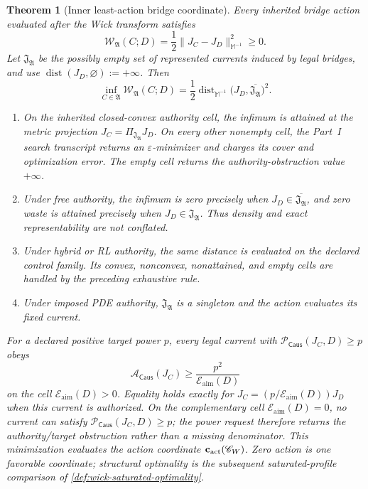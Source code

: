 \documentclass[11pt]{article}
\numberwithin{section}{part}
\theoremstyle{plain}
\newtheorem{theorem}{Theorem}[section]
\theoremstyle{definition}
\theoremstyle{remark}
\newcommand{\Caus}{\mathsf{Caus}}
\begin{document}
\begin{theorem}[Inner least-action bridge coordinate]
\label{thm:wick-least-action-law}
Every inherited bridge action evaluated after the Wick transform satisfies
\begin{equation}
 \label{eq:wick-completed-action-square}
 \mathscr W_{\mathfrak A}(C;D)
 =\frac12\|J_C-J_D\|_{\mathbb M^{-1}}^2\ge0.
\end{equation}
Let \(\mathfrak J_{\mathfrak A}\) be the possibly empty set of represented
currents induced by legal bridges, and use
\(\operatorname{dist}(J_D,\varnothing):=+\infty\).  Then
\begin{equation}
 \label{eq:wick-action-distance}
 \inf_{C\in\mathfrak A}\mathscr W_{\mathfrak A}(C;D)
 =\frac12\operatorname{dist}_{\mathbb M^{-1}}
   \bigl(J_D,\overline{\mathfrak J_{\mathfrak A}}\bigr)^2.
\end{equation}
\begin{enumerate}[label=\textup{(\roman*)}]
\item On the inherited closed-convex authority cell, the infimum is attained
  at the metric projection
  \(J_C=\Pi_{\mathfrak J_{\mathfrak A}}J_D\).  On every other nonempty cell,
  the Part~I search transcript returns an \(\varepsilon\)-minimizer and
  charges its cover and optimization error.  The empty cell returns the
  authority-obstruction value \(+\infty\).
\item Under free authority, the infimum is zero precisely when
  \(J_D\in\overline{\mathfrak J_{\mathfrak A}}\), and zero waste is attained
  precisely when \(J_D\in\mathfrak J_{\mathfrak A}\).  Thus density and exact
  representability are not conflated.
\item Under hybrid or RL authority, the same distance is evaluated on the
  declared control family.  Its convex, nonconvex, nonattained, and empty
  cells are handled by the preceding exhaustive rule.
\item Under imposed PDE authority, \(\mathfrak J_{\mathfrak A}\) is a
  singleton and the action evaluates its fixed current.
\end{enumerate}
For a declared positive target power \(p\), every legal current with
\(\mathcal P_{\Caus}(J_C,D)\ge p\) obeys
\begin{equation}
 \label{eq:wick-power-action-lower-bound}
 \mathcal A_{\Caus}(J_C)
 \ge\frac{p^2}{\mathcal E_{\mathrm{aim}}(D)}
\end{equation}
on the cell \(\mathcal E_{\mathrm{aim}}(D)>0\).  Equality holds exactly for
\(J_C=(p/\mathcal E_{\mathrm{aim}}(D))J_D\) when this current is authorized.
On the complementary cell \(\mathcal E_{\mathrm{aim}}(D)=0\), no current can
satisfy \(\mathcal P_{\Caus}(J_C,D)\ge p\); the power request therefore
returns the authority/target obstruction rather than a missing denominator.
This minimization evaluates the action coordinate
\(\mathbf c_{\rm act}(\mathscr C_W)\).  Zero action is one favorable
coordinate; structural optimality is the subsequent saturated-profile
comparison of \cref{def:wick-saturated-optimality}.
\end{theorem}
\end{document}
